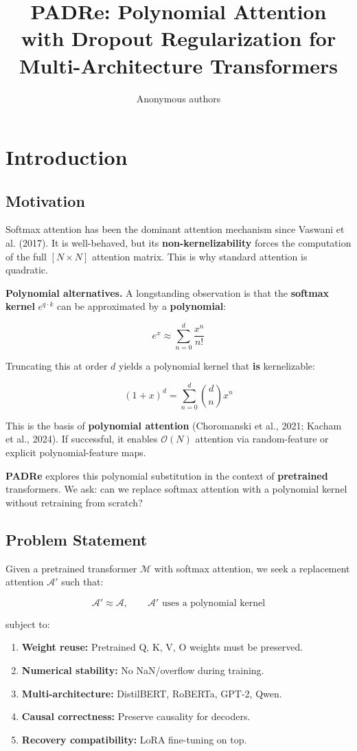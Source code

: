 \title{\textbf{PADRe: Polynomial Attention with Dropout Regularization for Multi-Architecture Transformers}}

\author{Anonymous authors}


\section{Introduction}

\subsection{Motivation}

Softmax attention has been the dominant attention mechanism since 
Vaswani et al. (2017). It is well-behaved, but its \textbf{non-kernelizability} 
forces the computation of the full $[N \times N]$ attention matrix. This 
is why standard attention is quadratic.

\textbf{Polynomial alternatives.} A longstanding observation is that the 
\textbf{softmax kernel} $e^{q \cdot k}$ can be approximated by a \textbf{polynomial}:

\[
e^x \approx \sum_{n=0}^{d} \frac{x^n}{n!}
\tag{1.1}
\]

Truncating this at order $d$ yields a polynomial kernel that \textbf{is} 
kernelizable:

\[
(1 + x)^d = \sum_{n=0}^{d} \binom{d}{n} x^n
\tag{1.2}
\]

This is the basis of \textbf{polynomial attention} (Choromanski et al., 2021; 
Kacham et al., 2024). If successful, it enables $\mathcal{O}(N)$ attention 
via random-feature or explicit polynomial-feature maps.

\textbf{PADRe} explores this polynomial substitution in the context of \textbf{pretrained} 
transformers. We ask: can we replace softmax attention with a polynomial 
kernel without retraining from scratch?

\subsection{Problem Statement}

Given a pretrained transformer $\mathcal{M}$ with softmax attention, we 
seek a replacement attention $\mathcal{A}'$ such that:

\[
\mathcal{A}' \approx \mathcal{A}, \qquad
\mathcal{A}' \text{ uses a polynomial kernel}
\tag{1.3}
\]

subject to:

\begin{enumerate}
\item \textbf{Weight reuse:} Pretrained Q, K, V, O weights must be preserved.
\item \textbf{Numerical stability:} No NaN/overflow during training.
\item \textbf{Multi-architecture:} DistilBERT, RoBERTa, GPT-2, Qwen.
\item \textbf{Causal correctness:} Preserve causality for decoders.
\item \textbf{Recovery compatibility:} LoRA fine-tuning on top.

\end{enumerate}
